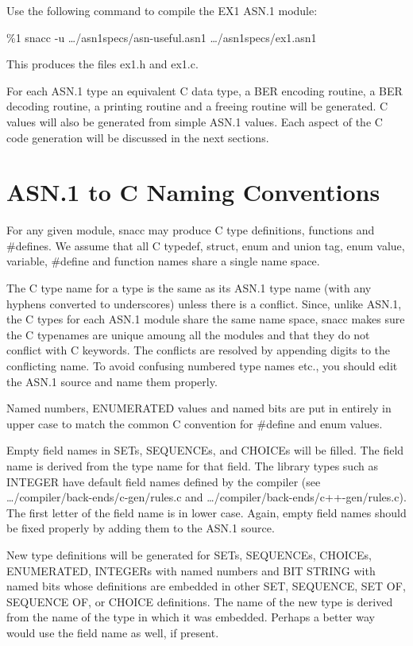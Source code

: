\noindent
Use the following command to compile the EX1 ASN.1 module:

\noindent
{\ufn \%1 snacc -u \dots/asn1specs/asn-useful.asn1 \dots/asn1specs/ex1.asn1}
\noindent

This produces the files {\ufn ex1.h} and {\ufn ex1.c}.

For each ASN.1 type an equivalent C data type, a BER encoding routine,
a BER decoding routine, a printing routine and a freeing routine will
be generated.  C values will also be generated from simple ASN.1
values.  Each aspect of the C code generation will be discussed in the
next sections.

\section{\label{naming-C-section}ASN.1 to C Naming Conventions}

For any given module, snacc may produce C type definitions, functions
and {\C \#define}s.  We assume that all C {\C typedef},
{\C struct}, {\C enum} and {\C union} tag, {\C enum} value,
variable, {\C \#define} and function names share a single name space.

The C type name for a type is the same as its ASN.1 type name (with
any hyphens converted to underscores) unless there is a conflict.
Since, unlike ASN.1, the C types for each ASN.1 module share the same
name space, snacc makes sure the C typenames are unique amoung all the
modules and that they do not conflict with C keywords.  The conflicts
are resolved by appending digits to the conflicting name.  To avoid
confusing numbered type names etc., you should edit the ASN.1 source
and name them properly.

Named numbers, ENUMERATED values and named bits are put in entirely in
upper case to match the common C convention for {\C \#define} and
{\C enum} values.

Empty field names in SETs, SEQUENCEs, and CHOICEs will be filled.  The
field name is derived from the type name for that field. The library
types such as INTEGER have default field names defined by the compiler
(see {\ufn \dots/compiler/back-ends/c-gen/rules.c} and
{\ufn \dots/compiler/back-ends/c++-gen/rules.c}).  The first letter of the field
name is in lower case.  Again, empty field names should be fixed
properly by adding them to the ASN.1 source.

New type definitions will be generated for SETs, SEQUENCEs, CHOICEs,
ENUMERATED, INTEGERs with named numbers and BIT STRING with named bits
whose definitions are embedded in other SET, SEQUENCE, SET OF,
SEQUENCE OF, or CHOICE definitions.  The name of the new type is
derived from the name of the type in which it was embedded.  Perhaps a
better way would use the field name as well, if present.

